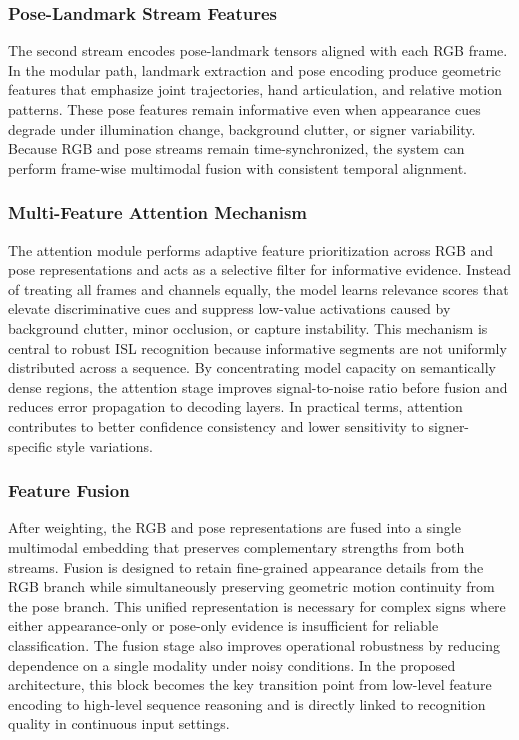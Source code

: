 \subsubsection{Pose-Landmark Stream Features}
The second stream encodes pose-landmark tensors aligned with each RGB frame. In the modular path, landmark extraction and pose encoding produce geometric features that emphasize joint trajectories, hand articulation, and relative motion patterns. These pose features remain informative even when appearance cues degrade under illumination change, background clutter, or signer variability. Because RGB and pose streams remain time-synchronized, the system can perform frame-wise multimodal fusion with consistent temporal alignment.

\subsubsection{Multi-Feature Attention Mechanism}
The attention module performs adaptive feature prioritization across RGB and pose representations and acts as a selective filter for informative evidence. Instead of treating all frames and channels equally, the model learns relevance scores that elevate discriminative cues and suppress low-value activations caused by background clutter, minor occlusion, or capture instability. This mechanism is central to robust ISL recognition because informative segments are not uniformly distributed across a sequence. By concentrating model capacity on semantically dense regions, the attention stage improves signal-to-noise ratio before fusion and reduces error propagation to decoding layers. In practical terms, attention contributes to better confidence consistency and lower sensitivity to signer-specific style variations.

\subsubsection{Feature Fusion}
After weighting, the RGB and pose representations are fused into a single multimodal embedding that preserves complementary strengths from both streams. Fusion is designed to retain fine-grained appearance details from the RGB branch while simultaneously preserving geometric motion continuity from the pose branch. This unified representation is necessary for complex signs where either appearance-only or pose-only evidence is insufficient for reliable classification. The fusion stage also improves operational robustness by reducing dependence on a single modality under noisy conditions. In the proposed architecture, this block becomes the key transition point from low-level feature encoding to high-level sequence reasoning and is directly linked to recognition quality in continuous input settings.

